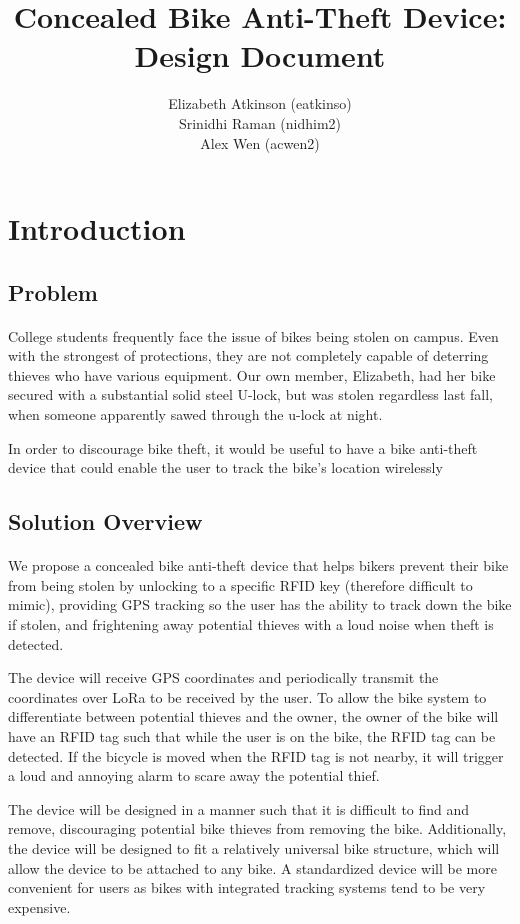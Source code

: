 \documentclass{article}
\title{Concealed Bike Anti-Theft Device: Design Document}
\author{Elizabeth Atkinson (eatkinso)\\ Srinidhi Raman (nidhim2) \\ Alex Wen (acwen2) }
\begin{document}
\section{Introduction}
\subsection{Problem}

\paragraph{}
College students frequently face the issue of bikes being stolen on campus. Even with the strongest of protections, they are not completely capable of deterring thieves who have various equipment. Our own member, Elizabeth, had her bike secured with a substantial solid steel U-lock, but was stolen regardless last fall, when someone apparently sawed through the u-lock at night. 

In order to discourage bike theft, it would be useful to have a bike anti-theft device that could enable the user to track the bike's location wirelessly

\subsection{Solution Overview}
\paragraph{}
We propose a concealed bike anti-theft device that helps bikers prevent their bike from being stolen by unlocking to a specific RFID key (therefore difficult to mimic), providing GPS tracking so the user has the ability to track down the bike if stolen, and frightening away potential thieves with a loud noise when theft is detected.

The device will receive GPS coordinates and periodically transmit the coordinates over LoRa to be received by the user. To allow the bike system to differentiate between potential thieves and the owner, the owner of the bike will have an RFID tag such that while the user is on the bike, the RFID tag can be detected. If the bicycle is moved when the RFID tag is not nearby, it will trigger a loud and annoying alarm to scare away the potential thief.

The device will be designed in a manner such that it is difficult to find and remove, discouraging potential bike thieves from removing the bike. Additionally, the device will be designed to fit a relatively universal bike structure, which will allow the device to be attached to any bike. A standardized device will be more convenient for users as bikes with integrated tracking systems tend to be very expensive.
\end{document}
